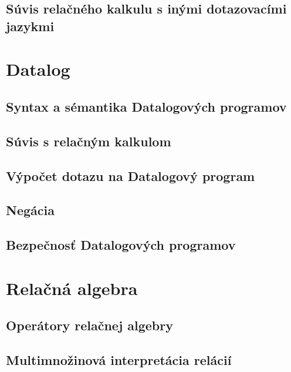 \documentclass[10pt,a4paper]{article}
\begin{document}
\subsection{Súvis relačného kalkulu s inými dotazovacími jazykmi}
    
\section{Datalog} 
\subsection{Syntax a sémantika Datalogových programov}
\subsection{Súvis s relačným kalkulom}
\subsection{Výpočet dotazu na Datalogový program}
\subsection{Negácia}
\subsection{Bezpečnosť Datalogových programov}
    
\section{Relačná algebra} 
\subsection{Operátory relačnej algebry}
\subsection{Multimnožinová interpretácia relácií}
\end{document}
